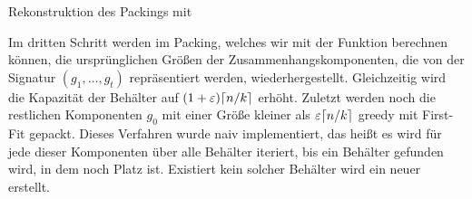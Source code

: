 \begin{algorithm}
    \caption{Rekonstruktion des Packings mit }
    \label{alg:bapa}
    \begin{algorithmic}[1]
             
                 
            \EndFor
        \EndFunction
    \end{algorithmic}
\end{algorithm}

 Im dritten Schritt werden im Packing, welches wir mit der Funktion  berechnen können, die ursprünglichen Größen der Zusammenhangskomponenten, die von der Signatur $(g_1, \ldots, g_t)$ repräsentiert werden, wiederhergestellt. 
Gleichzeitig wird die Kapazität der Behälter auf $(1+\varepsilon)\lceil n/k\rceil$ erhöht.
Zuletzt werden noch die restlichen Komponenten $g_0$ mit einer Größe kleiner als $\varepsilon \lceil n/k\rceil$ greedy mit First-Fit gepackt.
 Dieses Verfahren wurde naiv implementiert, das heißt es wird für jede dieser Komponenten über alle Behälter iteriert, bis ein Behälter gefunden wird, in dem noch Platz ist.
Existiert kein solcher Behälter wird ein neuer erstellt.

